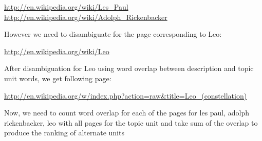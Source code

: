 \documentclass[11pt]{article}
\begin{document}
\url{http://en.wikipedia.org/wiki/Les_Paul}\\
\url{http://en.wikipedia.org/wiki/Adolph_Rickenbacker}

However we need to disambiguate for the page corresponding to Leo:

\url{http://en.wikipedia.org/wiki/Leo}

After disambiguation for Leo using word overlap between description and topic unit words, we get following page:

\url{http://en.wikipedia.org/w/index.php?action=raw&title=Leo_(constellation)}

Now, we need to count word overlap for each of the pages for les paul, adolph rickenbacker, leo with all pages for the topic unit and take sum of the overlap to produce the ranking of alternate units 
\end{document}
